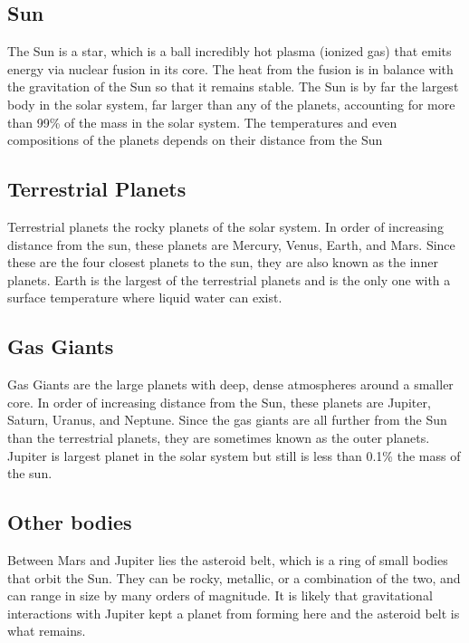 \documentclass[12pt]{book}
\begin{document}
\subsection{Sun}

The Sun is a star, which is a ball incredibly hot plasma (ionized gas) that emits energy via nuclear fusion in its core. The heat from the fusion is in balance with the gravitation of the Sun so that it remains stable. The Sun is by far the largest body in the solar system, far larger than any of the planets, accounting for more than 99\% of the mass in the solar system. The temperatures and even compositions of the planets depends on their distance from the Sun

\subsection{Terrestrial Planets}

Terrestrial planets the rocky planets of the solar system. In order of increasing distance from the sun, these planets are Mercury, Venus, Earth, and Mars. Since these are the four closest planets to the sun, they are also known as the inner planets. Earth is the largest of the terrestrial planets and is the only one with a surface temperature where liquid water can exist. 

\subsection{Gas Giants}

Gas Giants are the large planets with deep, dense atmospheres around a smaller core. In order of increasing distance from the Sun, these planets are Jupiter, Saturn, Uranus, and Neptune. Since the gas giants are all further from the Sun than the terrestrial planets, they are sometimes known as the outer planets. Jupiter is largest planet in the solar system but still is less than 0.1\% the mass of the sun.

\subsection{Other bodies}

Between Mars and Jupiter lies the asteroid belt, which is a ring of small bodies that orbit the Sun. They can be rocky, metallic, or a combination of the two, and can range in size by many orders of magnitude. It is likely that gravitational interactions with Jupiter kept a planet from forming here and the asteroid belt is what remains.
\end{document}
